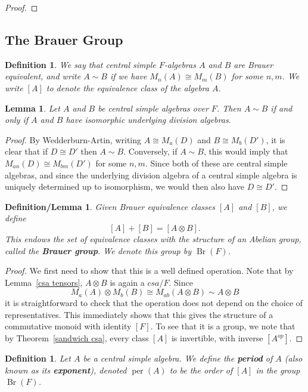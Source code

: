 \documentclass[12pt]{report}
\theoremstyle{plain}
\newtheorem{defn}[thm]{Definition}
\newtheorem{deflem}[thm]{Definition/Lemma}
\newtheorem{lem}[thm]{Lemma}
\newcommand{\oper}[1]{\operatorname{#1}}
\newcommand{\per}{\oper{per}}
\newcommand{\Br}{\oper{Br}}
\newcommand{\Xb}[1]{\textbf{#1}\index{#1}}
\begin{document}
\begin{proof}
\end{proof}

\subsection{The Brauer Group}

\begin{defn}
We say that central simple $F$-algebras $A$ and $B$ are Brauer equivalent,
and write $A \sim B$ if we have $M_n(A) \cong M_m(B)$ for some $n, m$. We
write $[A]$ to denote the equivalence class of the algebra $A$.
\end{defn}

\begin{lem} \label{breq division}
Let $A$ and $B$ be central simple algebras over $F$. Then $A \sim B$ if and
only if $A$ and $B$ have isomorphic underlying division algebras.
\end{lem}
\begin{proof}
By Wedderburn-Artin, writing $A \cong M_a(D)$ and $B \cong M_b(D')$, it is
clear that if $D \cong D'$ then $A \sim B$. Conversely, if $A \sim B$, this
would imply that $M_{an}(D) \cong M_{bm}(D')$ for some $n, m$. Since both
of these are central simple algebras, and since the underlying division
algebra of a central simple algebra is uniquely determined up to
isomorphism, we would then also have $D \cong D'$.
\end{proof}

\begin{deflem}
Given Brauer equivalence classes $[A]$ and $[B]$, we define
\[ [A] + [B] = [A \otimes B]. \]
This endows the set of equivalence classes with the structure of an Abelian
group, called the \Xb{Brauer group}. We denote this group by $\Br(F)$.
\end{deflem}
\begin{proof}
We first need to show that this is a well defined operation. Note that by
Lemma~\ref{csa tensors}, $A \otimes B$ is again a $csa/F$. 
Since 
\[ M_a(A) \otimes M_b(B) \cong M_{ab}(A \otimes B) \sim A \otimes B \]
it is straightforward to check that the operation does not depend on the
choice of representatives. This immediately shows that this gives the
structure of a commutative monoid with identity $[F]$. To see that it is a
group, we note that by Theorem~\ref{sandwich csa}, every class $[A]$ is
invertible, with inverse $[A^{op}]$.
\end{proof}

\begin{defn}
Let $A$ be a central simple algebra. We define the \Xb{period} of $A$ (also
known as its \Xb{exponent}), denoted $\per(A)$ to be the order of $[A]$ in
the group $\Br(F)$.
\end{defn}
\end{document}

